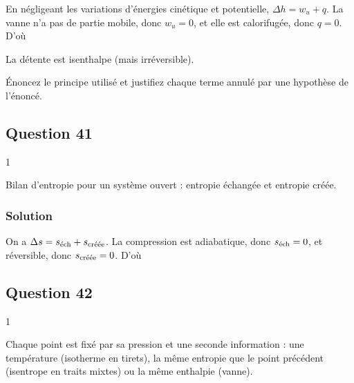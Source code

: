 \documentclass[11pt,a4paper]{article}
\newcommand{\equationajustee}[1]{%
  \sbox{\boiteequation}{$\displaystyle #1$}%
  \ifdim\wd\boiteequation>\linewidth
    \[\resizebox{\linewidth}{!}{\usebox{\boiteequation}}\]%
  \else
    \[#1\]%
  \fi}
\begin{document}
En négligeant les variations d'énergies cinétique et potentielle, \(\Delta h=w_u+q\). La vanne n'a pas de partie mobile, donc \(w_u=0\), et elle est calorifugée, donc \(q=0\). D'où

\equationajustee{\boxed{h_6=h_5}}

La détente est isenthalpe (mais irréversible).

\begin{jury}

Énoncez le principe utilisé et justifiez chaque terme annulé par une hypothèse de l'énoncé.

\end{jury}

\hypertarget{question-41}{%
\subsection{Question 41}\label{question-41}}

\begin{indication}{1}

Bilan d'entropie pour un système ouvert : entropie échangée et entropie créée.

\end{indication}

\hypertarget{solution-40}{%
\subsubsection{Solution}\label{solution-40}}

On a \(\Delta s=s_{\text{\text{éch}}}+s_{\text{\text{créée}}}\). La compression est adiabatique, donc \(s_{\text{\text{éch}}}=0\), et réversible, donc \(s_{\text{\text{créée}}}=0\). D'où

\equationajustee{\boxed{s_2=s_1}}

\equationajustee{\boxed{s_4=s_3}}

\hypertarget{question-42}{%
\subsection{Question 42}\label{question-42}}

\begin{indication}{1}

Chaque point est fixé par sa pression et une seconde information : une température (isotherme en tirets), la même entropie que le point précédent (isentrope en traits mixtes) ou la même enthalpie (vanne).

\end{indication}
\end{document}
